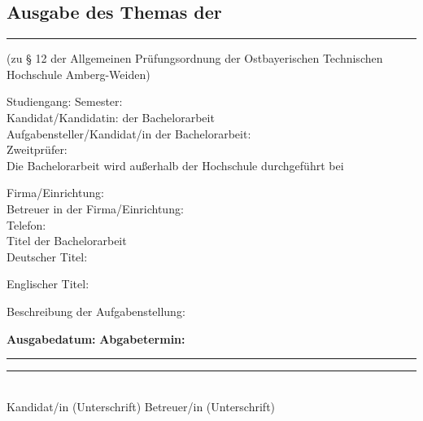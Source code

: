\documentclass{ausgabeOTH}
\begin{document}
\subsection*{Ausgabe des Themas der \MaBaArbeit}
\vspace*{-.5cm}
\noindent\rule[1ex]{\textwidth}{1pt} %
\small{(zu § 12 der Allgemeinen Prüfungsordnung der Ostbayerischen Technischen Hochschule Amberg-Weiden)}
\normalsize



Studiengang: \Studiengang \hfill Semester: \Semester\\
Kandidat/Kandidatin: der Bachelorarbeit \hfill \Student \\
Aufgabensteller/Kandidat/in der Bachelorarbeit:\hfill \Aufgabensteller\\
Zweitprüfer:\hfill \Zweitpruefer\\

Die Bachelorarbeit wird außerhalb der Hochschule durchgeführt bei

Firma/Einrichtung:\hfill \Firma\\
Betreuer in der Firma/Einrichtung: \hfill \Firmenbetreuer\\
Telefon:\hfill \Telefon\\

Titel der Bachelorarbeit\\
Deutscher Titel: \Titel

Englischer Titel: \TitelEnglisch

Beschreibung der Aufgabenstellung: \Beschreibung

\vfill


\textbf{Ausgabedatum: \Ausgabe}\hfill \textbf{Abgabetermin: \Abgabe}\\
\vspace*{1cm}

\rule{0.3\textwidth}{1pt}\hfill \rule{0.3\textwidth}{.5pt}\\
\tiny{Kandidat/in (Unterschrift)} \hfill \tiny{Betreuer/in (Unterschrift)}\\
\end{document}
